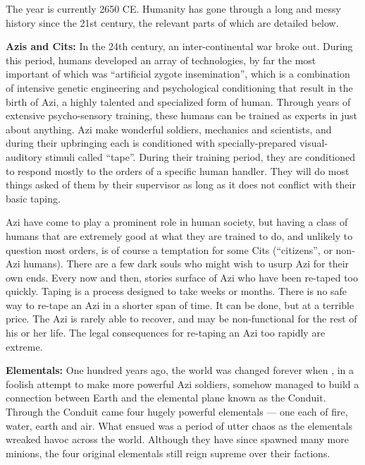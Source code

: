\documentclass[blue]{elementals}
\begin{document}
\name{\bHumanHistory{}}

The year is currently 2650 CE. Humanity has gone through a long and messy history since the 21st century, the relevant parts of which are detailed below. 

{\bf Azis and Cits:}
In the 24th century, an inter-continental war broke out. During this period, humans developed an array of technologies, by far the most important of which was ``artificial zygote insemination'', which is a combination of intensive genetic engineering and psychological conditioning that result in the birth of Azi, a highly talented and specialized form of human. Through years of extensive psycho-sensory training, these humans can be trained as experts in just about anything. Azi make wonderful soldiers, mechanics and scientists, and during their upbringing each is conditioned with specially-prepared visual-auditory stimuli called ``tape''. During their training period, they are conditioned to respond mostly to the orders of a specific human handler. They will do most things asked of them by their supervisor as long as it does not conflict with their basic taping.

Azi have come to play a prominent role in human society, but having a class of humans that are extremely good at what they are trained to do, and unlikely to question most orders, is of course a temptation for some Cits (``citizens'', or non-Azi humans). There are a few dark souls who might wish to usurp Azi for their own ends. Every now and then, stories surface of Azi who have been re-taped too quickly.  Taping is a process designed to take weeks or months. There is no safe way to re-tape an Azi in a shorter span of time. It can be done, but at a terrible price. The Azi is rarely able to recover, and may be non-functional for the rest of his or her life.  The legal consequences for re-taping an Azi too rapidly are extreme.

{\bf Elementals:}
One hundred years ago, the world was changed forever when \cGrandfather{\full}, in a foolish attempt to make more powerful Azi soldiers, somehow managed to build a connection between Earth and the elemental plane known as the Conduit. Through the Conduit came four hugely powerful elementals --- one each of fire, water, earth and air. What ensued was a period of utter chaos as the elementals wreaked havoc across the world. Although they have since spawned many more minions, the four original elementals still reign supreme over their factions.
\end{document}
